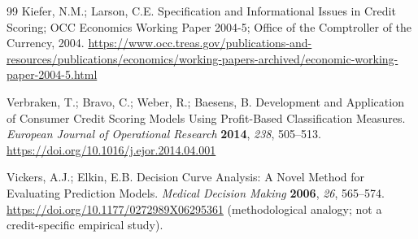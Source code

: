 \documentclass[10pt]{article}
\begin{document}
\begin{thebibliography}{99}
Kiefer, N.M.; Larson, C.E. Specification and Informational Issues in Credit Scoring; OCC Economics Working Paper 2004-5; Office of the Comptroller of the Currency, 2004. \url{https://www.occ.treas.gov/publications-and-resources/publications/economics/working-papers-archived/economic-working-paper-2004-5.html}

Verbraken, T.; Bravo, C.; Weber, R.; Baesens, B. Development and Application of Consumer Credit Scoring Models Using Profit-Based Classification Measures. \textit{European Journal of Operational Research} \textbf{2014}, \textit{238}, 505--513. \url{https://doi.org/10.1016/j.ejor.2014.04.001}

Vickers, A.J.; Elkin, E.B. Decision Curve Analysis: A Novel Method for Evaluating Prediction Models. \textit{Medical Decision Making} \textbf{2006}, \textit{26}, 565--574. \url{https://doi.org/10.1177/0272989X06295361} (methodological analogy; not a credit-specific empirical study).

\end{thebibliography}
\end{document}

